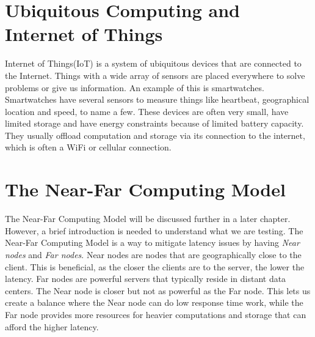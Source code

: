 
\section{Ubiquitous Computing and Internet of Things}

Internet of Things(IoT) is a system of ubiquitous devices that are connected to the Internet\cite{noauthor_what_nodate}. Things with a wide array of sensors are placed everywhere to solve problems or give us information. An example of this is smartwatches. Smartwatches have several sensors to measure things like heartbeat, geographical location and speed, to name a few. These devices are often very small, have limited storage and have energy constraints because of limited battery capacity. They usually offload computation and storage via its connection to the internet, which is often a WiFi or cellular connection. 






\section{The Near-Far Computing Model}
The Near-Far Computing Model will be discussed further in a later chapter. However, a brief introduction is needed to understand what we are testing. The Near-Far Computing Model is a way to mitigate latency issues by having \textit{Near nodes} and \textit{Far nodes}. Near nodes are nodes that are geographically close to the client. This is beneficial, as the closer the clients are to the server, the lower the latency. Far nodes are powerful servers that typically reside in distant data centers. The Near node is closer but not as powerful as the Far node. This lets us create a balance where the Near node can do low response time work, while the Far node provides more resources for heavier computations and storage that can afford the higher latency.




